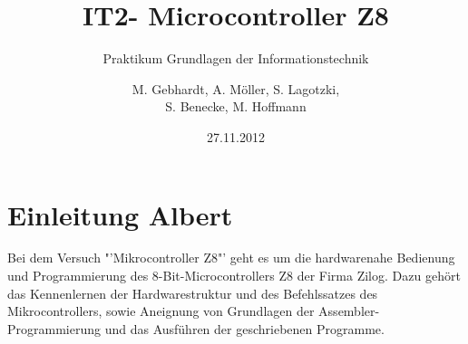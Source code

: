 
\usepackage{paralist} %
\usepackage{circuitikz} %
\usepackage{picins}
\usepackage{wasysym}
\usepackage{pict2e}
\usepackage{lscape}
\usepackage{soul}
\usepackage[right]{eurosym}
\usepackage{array}
\usepackage{multirow}
\usepackage{tikz}
\usetikzlibrary{shapes,arrows}
\title{IT2- Microcontroller Z8}
\subtitle{Praktikum Grundlagen der Informationstechnik}
\author{M. Gebhardt, A. Möller, S. Lagotzki,\\S. Benecke, M. Hoffmann}
\date{27.11.2012}
\publishers{Marc.Gebhardt@st.ovgu.de}

\maketitle
{}
\begingroup
  \pagestyle{empty}
  \tableofcontents
  \newpage
\endgroup  
\setcounter{page}{1}


\section{Einleitung Albert}
Bei dem Versuch "'Mikrocontroller Z8"' geht es um die hardwarenahe Bedienung und Programmierung des 8-Bit-Microcontrollers Z8 der Firma Zilog. Dazu gehört das Kennenlernen der Hardwarestruktur und des Befehlssatzes des Mikrocontrollers, sowie Aneignung von Grundlagen der Assembler-Programmierung und das Ausführen der geschriebenen Programme. 

